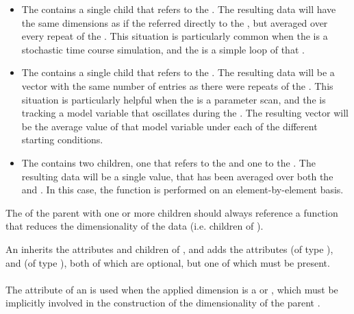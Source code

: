 \begin{itemize}
        \item The \Variable contains a single \AppliedDimension child that refers to the \RepeatedTask.  The resulting data will have the same dimensions as if the \Variable referred directly to the \Task, but averaged over every repeat of the \RepeatedTask.  This situation is particularly common when the \Task is a stochastic time course simulation, and the \RepeatedTask is a simple loop of that \Task.
        \item The \Variable contains a single \AppliedDimension child that refers to the \Task.  The resulting data will be a vector with the same number of entries as there were repeats of the \RepeatedTask.  This situation is particularly helpful when the \RepeatedTask is a parameter scan, and the \Variable is tracking a model variable that oscillates during the \Task.  The resulting vector will be the average value of that model variable under each of the different starting conditions.
        \item The \Variable contains two \AppliedDimension children, one that refers to the \RepeatedTask and one to the \Task.  The resulting data will be a single value, that has been averaged over both the \Task and \RepeatedTask.  In this case, the function is performed on an element-by-element basis.
\end{itemize}

The  of the parent \Variable with one or more \AppliedDimension children should always reference a function that reduces the dimensionality of the data (i.e. children of ).



An \AppliedDimension inherits the attributes and children of \SedBase, and adds the attributes  (of type \SIdRef), and  (of type ), both of which are optional, but one of which must be present.

\paragraph*{}
The  attribute of an \AppliedDimension is used when the applied dimension is a \Task or \RepeatedTask, which must be implicitly involved in the construction of the dimensionality of the parent \Variable.

